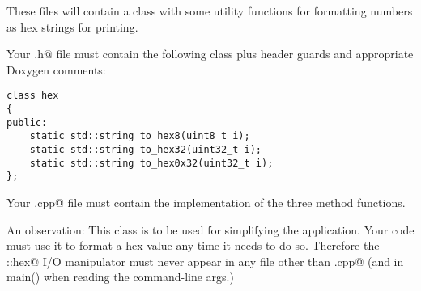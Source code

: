 \documentclass[11pt]{article}
\begin{document}
These files will contain a class with some utility functions for formatting 
numbers as hex strings for printing.

Your \verb@hex.h@ file must contain the following class plus header guards and 
appropriate Doxygen comments:\\
\begin{minipage}{\textwidth}
\begin{lstlisting}[frame=single, title={hex.h}]
class hex
{
public: 
    static std::string to_hex8(uint8_t i);
    static std::string to_hex32(uint32_t i);
    static std::string to_hex0x32(uint32_t i);
};
\end{lstlisting}
\end{minipage}

Your \verb@hex.cpp@ file must contain the implementation of the three method functions.

An observation: This class is to be used for simplifying the application.  Your
code must use it to format a hex value any time it needs to do so.  
Therefore the \verb@std::hex@ I/O manipulator must never appear in any file 
other than \verb@hex.cpp@ (and in main() when reading the command-line args.)
\end{document}
